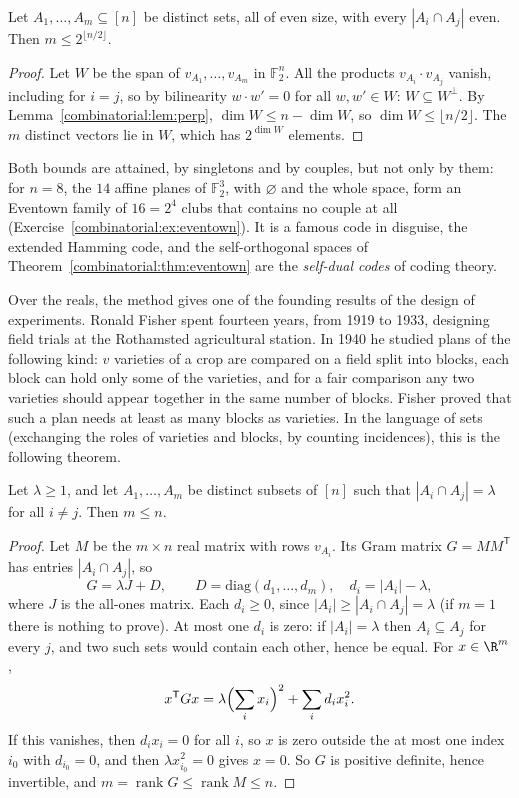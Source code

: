 \begin{theorem}\label{combinatorial:thm:eventown}
Let $A_1,\dots,A_m\subseteq[n]$ be distinct sets, all of even size, with every $|A_i\cap A_j|$ even. Then $m\le2^{\lfloor n/2\rfloor}$.
\end{theorem}
\begin{proof}
Let $W$ be the span of $v_{A_1},\dots,v_{A_m}$ in $\mathbb F_2^n$. All the products $v_{A_i}\cdot v_{A_j}$ vanish, including for $i=j$, so by bilinearity $w\cdot w'=0$ for
all $w,w'\in W$: $W\subseteq W^\perp$. By Lemma~\ref{combinatorial:lem:perp}, $\dim W\le n-\dim W$, so $\dim W\le\lfloor n/2\rfloor$. The $m$ distinct vectors lie in $W$, which has
$2^{\dim W}$ elements.
\end{proof}

Both bounds are attained, by singletons and by couples, but not only by them: for $n=8$, the $14$ affine planes of $\mathbb F_2^3$, with $\varnothing$ and the whole space, form an Eventown family of $16=2^4$ clubs
that contains no couple at all (Exercise~\ref{combinatorial:ex:eventown}). It is a famous code in disguise, the extended Hamming code, and the self-orthogonal spaces of Theorem~\ref{combinatorial:thm:eventown} are the
\emph{self-dual codes} of coding theory.

Over the reals, the method gives one of the founding results of the design of experiments. Ronald Fisher spent fourteen years, from 1919 to 1933, designing field trials at the Rothamsted
agricultural station. In 1940 he studied plans of the following kind: $v$ varieties of a crop are compared on a field split into blocks, each block can hold only some of the varieties, and for a fair comparison any two varieties
should appear together in the same number of blocks. Fisher proved that such a plan needs at least as many blocks as varieties. In the language of sets (exchanging
the roles of varieties and blocks, by counting incidences), this is the following theorem.

\begin{theorem}\label{combinatorial:thm:fisher}
Let $\lambda\ge1$, and let $A_1,\dots,A_m$ be distinct subsets of $[n]$ such that $|A_i\cap A_j|=\lambda$ for all $i\ne j$. Then $m\le n$.
\end{theorem}
\begin{proof}
Let $M$ be the $m\times n$ real matrix with rows $v_{A_i}$. Its Gram matrix $G=MM^{\mathsf T}$ has entries $|A_i\cap A_j|$, so
\[
G=\lambda J+D,\qquad D=\mathrm{diag}(d_1,\dots,d_m),\quad d_i=|A_i|-\lambda,
\]
where $J$ is the all-ones matrix. Each $d_i\ge0$, since $|A_i|\ge|A_i\cap A_j|=\lambda$ (if $m=1$ there is nothing to prove). At most one $d_i$ is zero: if $|A_i|=\lambda$
then $A_i\subseteq A_j$ for every $j$, and two such sets would contain each other, hence be equal. For $x\in\R^m$,
\[
x^{\mathsf T}Gx=\lambda\Bigl(\sum_ix_i\Bigr)^2+\sum_id_ix_i^2.
\]
If this vanishes, then $d_ix_i=0$ for all $i$, so $x$ is zero outside the at most one index $i_0$ with $d_{i_0}=0$, and then $\lambda x_{i_0}^2=0$ gives $x=0$. So $G$ is positive definite,
hence invertible, and $m=\operatorname{rank}G\le\operatorname{rank}M\le n$.
\end{proof}


